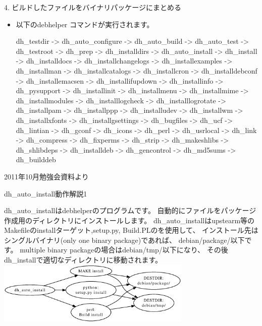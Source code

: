 \begin{frame}[containsverbatim]{4. ビルドしたファイルをバイナリパッケージにまとめる}
\begin{itemize}

\item 以下のdebhelper コマンドが実行されます。
\begin{commandlinesmall}
dh_testdir -> dh_auto_configure -> dh_auto_build -> dh_auto_test
-> dh_testroot -> dh_prep -> dh_installdirs -> dh_auto_install
-> dh_install -> dh_installdocs -> dh_installchangelogs
-> dh_installexamples -> dh_installman -> dh_installcatalogs
-> dh_installcron -> dh_installdebconf -> dh_installemacsen
-> dh_installifupdown -> dh_installinfo -> dh_pysupport
-> dh_installinit -> dh_installmenu -> dh_installmime
-> dh_installmodules -> dh_installlogcheck -> dh_installlogrotate
-> dh_installpam -> dh_installppp -> dh_installudev -> dh_installwm
-> dh_installxfonts -> dh_installgsettings -> dh_bugfiles -> dh_ucf
-> dh_lintian -> dh_gconf -> dh_icons -> dh_perl -> dh_usrlocal
-> dh_link -> dh_compress -> dh_fixperms -> dh_strip -> dh_makeshlibs
-> dh_shlibdeps -> dh_installdeb -> dh_gencontrol -> dh_md5sums
-> dh_builddeb
\end{commandlinesmall}
\end{itemize}
2011年10月勉強会資料より
\end{frame}

\begin{frame}{dh\_auto\_install動作解説1}

dh\_auto\_installはdebhelperのプログラムです。
自動的にファイルをパッケージ作成用のディレクトリにインストールします。
dh\_auto\_installはupstearm等のMakefileのinstallターゲット,setup.py,
Build.PLのを使用して、
インストール先はシングルバイナリ(only one binary package)であれば、
debian/package/以下です。
multiple binary packageの場合はdebian/tmp/以下になり、
その後dh\_installで適切なディレクトリに移動されます。
\includegraphics[height=3cm]{image201303/dh_auto_install1.eps}
\end{frame}

